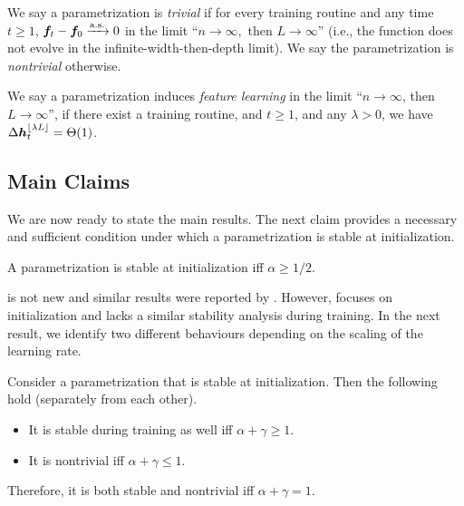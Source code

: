 \documentclass{article}
\theoremstyle{plain}
\theoremstyle{definition}
\begin{document}
\begin{defn}[Nontriviality]
    We say a parametrization is \emph{trivial} if for every training routine and any time $t\ge1$, $\boldsymbol{f}_{t}-\boldsymbol{f}_{0}\xrightarrow{\mathrm{\mathrm{a.s.}}}0$ in the limit ``$n\to\infty,$ then $L \to \infty$'' (i.e., the function does not evolve in the infinite-width-then-depth limit). We say the parametrization is \emph{nontrivial} otherwise.
  \end{defn}

\begin{defn}
    We say a parametrization induces \emph{feature learning} in the limit ``$n \to \infty$, then $L \to \infty$'', if there exist a training routine, and $t\ge1$, and any $\lambda > 0$, we have $\Delta\boldsymbol{h}_{t}^{\lfloor\lambda L\rfloor} = \Theta(1)$.
  \end{defn}

\subsection{Main Claims}
 We are now ready to state the main results. The next claim provides a necessary and sufficient condition under which a parametrization is stable at initialization.

\begin{claim}\label{clm:stability_init}
    A parametrization is stable at initialization iff $\alpha\ge1/2$.
\end{claim}
 is not new and similar results were reported by \citet{hayou21stable}. However, \citet{hayou21stable} focuses on initialization and lacks a similar stability analysis during training. In the next result, we identify two different behaviours depending on the scaling of the learning rate.
\begin{claim}\label{clm:stable_non_trivial}
Consider a parametrization that is stable at initialization. Then the following hold (separately from each other).
\begin{itemize}
    \item It is stable during training as well iff $\alpha + \gamma \ge 1$.
    \item It is nontrivial iff $\alpha + \gamma \le 1$.
\end{itemize}
Therefore, it is both stable and nontrivial iff $\alpha + \gamma = 1$.
\end{claim}
\end{document}
